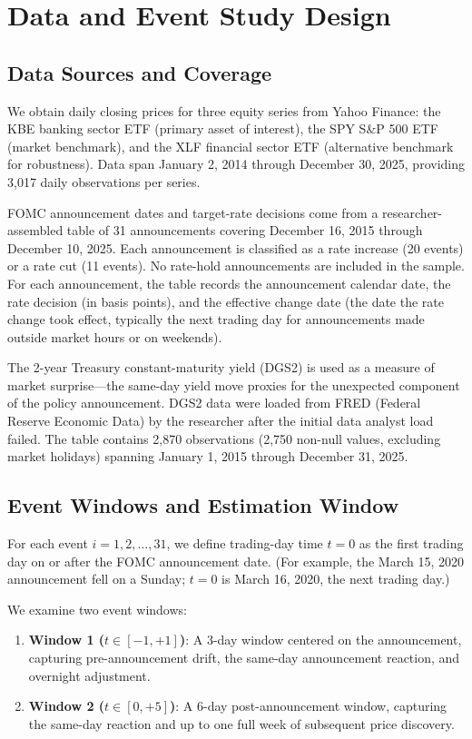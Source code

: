 \documentclass[11pt]{article}
\begin{document}
\section{Data and Event Study Design}

\subsection{Data Sources and Coverage}

We obtain daily closing prices for three equity series from Yahoo Finance: the KBE banking sector ETF (primary asset of interest), the SPY S\&P 500 ETF (market benchmark), and the XLF financial sector ETF (alternative benchmark for robustness). Data span January 2, 2014 through December 30, 2025, providing 3,017 daily observations per series.

FOMC announcement dates and target-rate decisions come from a researcher-assembled table of 31 announcements covering December 16, 2015 through December 10, 2025. Each announcement is classified as a rate increase (20 events) or a rate cut (11 events). No rate-hold announcements are included in the sample. For each announcement, the table records the announcement calendar date, the rate decision (in basis points), and the effective change date (the date the rate change took effect, typically the next trading day for announcements made outside market hours or on weekends).

The 2-year Treasury constant-maturity yield (DGS2) is used as a measure of market surprise—the same-day yield move proxies for the unexpected component of the policy announcement. DGS2 data were loaded from FRED (Federal Reserve Economic Data) by the researcher after the initial data analyst load failed. The table contains 2,870 observations (2,750 non-null values, excluding market holidays) spanning January 1, 2015 through December 31, 2025.

\subsection{Event Windows and Estimation Window}

For each event $i = 1, 2, \ldots, 31$, we define trading-day time $t = 0$ as the first trading day on or after the FOMC announcement date. (For example, the March 15, 2020 announcement fell on a Sunday; $t=0$ is March 16, 2020, the next trading day.)

We examine two event windows:

\begin{enumerate}
	\item \textbf{Window 1 ($t \in [-1, +1]$)}: A 3-day window centered on the announcement, capturing pre-announcement drift, the same-day announcement reaction, and overnight adjustment.
	\item \textbf{Window 2 ($t \in [0, +5]$)}: A 6-day post-announcement window, capturing the same-day reaction and up to one full week of subsequent price discovery.
\end{enumerate}
\end{document}
